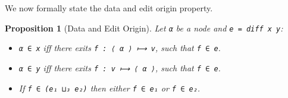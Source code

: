 \documentclass{sigplanconf}
\theoremstyle{plain}
\newtheorem{prop}{Proposition}
\begin{document}


We now formally state the data and edit origin property.
\begin{prop}[Data and Edit Origin]
\label{prop:sanity}
Let \texttt{α} be a node and \texttt{e = diff x y}:
\begin{itemize}
\item \texttt{α ∈ x} iff there exits \texttt{f : ⟨ α ⟩ ⟼ v}, such that
  \texttt{f ∈ e}.
\item \texttt{α ∈ y} iff there exits \texttt{f : v ⟼ ⟨ α ⟩}, such that
  \texttt{f ∈ e}.
\item If \texttt{f ∈ (e₁ ⊔₃ e₂)} then either \texttt{f ∈ e₁} or
  \texttt{f ∈ e₂}.
\end{itemize}
\end{prop}
\end{document}
